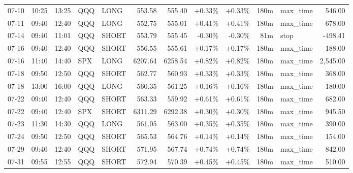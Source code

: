 \documentclass[11pt,a4paper,twoside]{article}
\begin{document}
\begin{center}
\begin{longtable}{>{\color{txtmain}}l l l l l r r r r r >{\color{txtmain}}l r}
07-10 & 10:25 & 13:25 & QQQ & LONG & 553.58 & 555.40 & \textcolor{wingreen}{+0.33\%} & \textcolor{wingreen}{+0.33\%} & 180m & max\_time & \textcolor{wingreen}{546.00} \\
07-11 & 09:40 & 12:40 & QQQ & LONG & 552.75 & 555.01 & \textcolor{wingreen}{+0.41\%} & \textcolor{wingreen}{+0.41\%} & 180m & max\_time & \textcolor{wingreen}{678.00} \\
07-14 & 09:40 & 11:01 & QQQ & SHORT & 553.79 & 555.45 & \textcolor{lossred}{-0.30\%} & \textcolor{lossred}{-0.30\%} & 81m & stop & \textcolor{lossred}{-498.41} \\
07-16 & 09:40 & 12:40 & QQQ & SHORT & 556.55 & 555.61 & \textcolor{wingreen}{+0.17\%} & \textcolor{wingreen}{+0.17\%} & 180m & max\_time & \textcolor{wingreen}{188.00} \\
07-16 & 11:40 & 14:40 & SPX & LONG & 6207.64 & 6258.54 & \textcolor{wingreen}{+0.82\%} & \textcolor{wingreen}{+0.82\%} & 180m & max\_time & \textcolor{wingreen}{2,545.00} \\
07-18 & 09:50 & 12:50 & QQQ & SHORT & 562.77 & 560.93 & \textcolor{wingreen}{+0.33\%} & \textcolor{wingreen}{+0.33\%} & 180m & max\_time & \textcolor{wingreen}{368.00} \\
07-18 & 13:00 & 16:00 & QQQ & LONG & 560.35 & 561.25 & \textcolor{wingreen}{+0.16\%} & \textcolor{wingreen}{+0.16\%} & 180m & max\_time & \textcolor{wingreen}{180.00} \\
07-22 & 09:40 & 12:40 & QQQ & SHORT & 563.33 & 559.92 & \textcolor{wingreen}{+0.61\%} & \textcolor{wingreen}{+0.61\%} & 180m & max\_time & \textcolor{wingreen}{682.00} \\
07-22 & 09:40 & 12:40 & SPX & SHORT & 6311.29 & 6292.38 & \textcolor{wingreen}{+0.30\%} & \textcolor{wingreen}{+0.30\%} & 180m & max\_time & \textcolor{wingreen}{945.50} \\
07-23 & 11:30 & 14:30 & QQQ & LONG & 561.05 & 563.00 & \textcolor{wingreen}{+0.35\%} & \textcolor{wingreen}{+0.35\%} & 180m & max\_time & \textcolor{wingreen}{390.00} \\
07-24 & 09:50 & 12:50 & QQQ & SHORT & 565.53 & 564.76 & \textcolor{wingreen}{+0.14\%} & \textcolor{wingreen}{+0.14\%} & 180m & max\_time & \textcolor{wingreen}{154.00} \\
07-29 & 09:40 & 12:40 & QQQ & SHORT & 571.95 & 567.74 & \textcolor{wingreen}{+0.74\%} & \textcolor{wingreen}{+0.74\%} & 180m & max\_time & \textcolor{wingreen}{842.00} \\
07-31 & 09:55 & 12:55 & QQQ & SHORT & 572.94 & 570.39 & \textcolor{wingreen}{+0.45\%} & \textcolor{wingreen}{+0.45\%} & 180m & max\_time & \textcolor{wingreen}{510.00} \\

\end{longtable}
\end{center}
\end{document}
